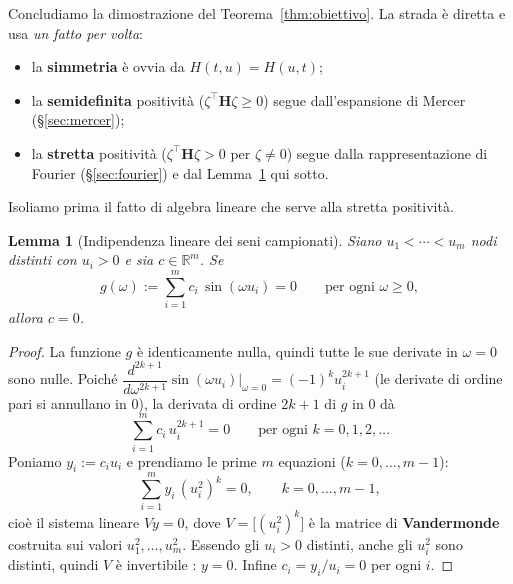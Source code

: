 \documentclass[11pt,a4paper]{article}
\theoremstyle{plain}
\newtheorem{lemma}[teorema]{Lemma}
\theoremstyle{remark}
\newcommand{\Hmat}{\mathbf{H}}
\newcommand{\transp}{^{\!\top}}
\newcommand{\R}{\mathbb{R}}
\begin{document}
Concludiamo la dimostrazione del Teorema~\ref{thm:obiettivo}. La strada \`e diretta e usa
\emph{un fatto per volta}:
\begin{itemize}
  \item la \textbf{simmetria} \`e ovvia da $H(t,u)=H(u,t)$;
  \item la \textbf{semidefinita} positivit\`a ($\zeta\transp\Hmat\zeta\ge0$) segue dall'espansione
    di Mercer (§\ref{sec:mercer});
  \item la \textbf{stretta} positivit\`a ($\zeta\transp\Hmat\zeta>0$ per $\zeta\ne0$) segue dalla
    rappresentazione di Fourier (§\ref{sec:fourier}) e dal Lemma~\ref{lem:indip} qui sotto.
\end{itemize}
Isoliamo prima il fatto di algebra lineare che serve alla stretta positivit\`a.

\begin{lemma}[Indipendenza lineare dei seni campionati]
\label{lem:indip}
Siano $u_1<\cdots<u_m$ nodi \emph{distinti} con $u_i>0$ e sia $c\in\R^m$. Se
\[
  g(\omega):=\sum_{i=1}^m c_i\,\sin(\omega u_i)=0 \qquad\text{per ogni }\omega\ge0,
\]
allora $c=0$.
\end{lemma}
\begin{proof}
La funzione $g$ \`e identicamente nulla, quindi tutte le sue derivate in $\omega=0$ sono nulle.
Poich\'e $\dfrac{d^{2k+1}}{d\omega^{2k+1}}\sin(\omega u_i)\Big|_{\omega=0}=(-1)^k u_i^{2k+1}$
(le derivate di ordine pari si annullano in $0$), la derivata di ordine $2k+1$ di $g$ in $0$ d\`a
\[
  \sum_{i=1}^m c_i\,u_i^{2k+1}=0 \qquad\text{per ogni }k=0,1,2,\dots
\]
Poniamo $y_i:=c_i u_i$ e prendiamo le prime $m$ equazioni ($k=0,\dots,m-1$):
\[
  \sum_{i=1}^m y_i\,(u_i^2)^{k}=0,\qquad k=0,\dots,m-1,
\]
cio\`e il sistema lineare $V y=0$, dove $V=\bigl[(u_i^2)^{k}\bigr]$ \`e la matrice di
\textbf{Vandermonde} costruita sui valori $u_1^2,\dots,u_m^2$. Essendo gli $u_i>0$ distinti,
anche gli $u_i^2$ sono distinti, quindi $V$ \`e invertibile \cite{quarteroni2017}: $y=0$. Infine
$c_i=y_i/u_i=0$ per ogni $i$.
\end{proof}
\end{document}
